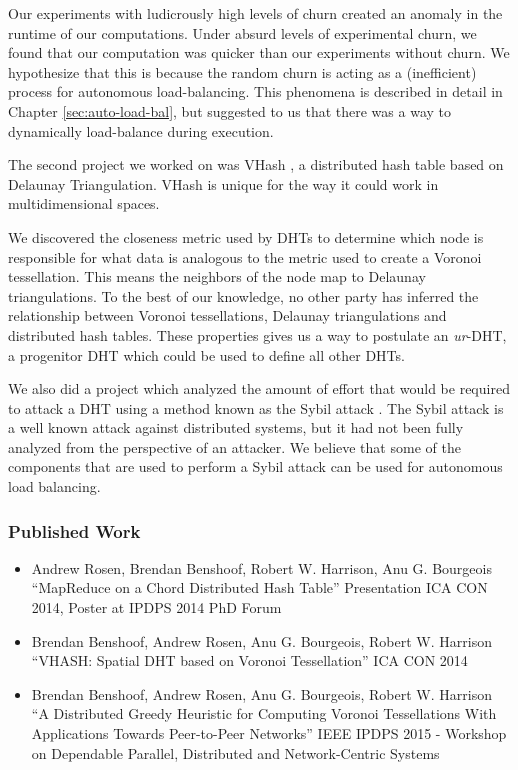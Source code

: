 Our experiments with ludicrously high levels of churn created an anomaly in the runtime of our computations.
Under absurd levels of experimental churn, we found that our computation was quicker than our experiments without churn.
We hypothesize that this is because the random churn is acting as a (inefficient) process for autonomous load-balancing.
This phenomena is described in detail in Chapter \ref{sec:auto-load-bal}, but suggested to us that there was a way to  dynamically load-balance during execution.

The second project we worked on was VHash \cite{vhash} \cite{dgvh}, a distributed hash table based on Delaunay Triangulation.
VHash is unique for the way it could work in multidimensional spaces.

We discovered the closeness metric used by DHTs to determine which node is responsible for what data is analogous to the metric used to create a Voronoi tessellation.
This means the neighbors of the node map to Delaunay triangulations. 
To the best of our knowledge, no other party has inferred the relationship between Voronoi tessellations, Delaunay triangulations and distributed hash tables.
These properties gives us a way to postulate an \textit{ur}-DHT, a progenitor DHT which could be used to define all other DHTs.




We also did a project which analyzed the amount of effort that would be required to attack a DHT using a method known as the Sybil attack \cite{sybil-analysis}.
The Sybil attack \cite{sybil} is a well known attack against distributed systems, but it had not been fully analyzed from the perspective of an attacker.
We believe that some of the components that are used to perform a Sybil attack can be used for autonomous load balancing.



\subsubsection{Published Work}

\begin{itemize}
	\item Andrew Rosen, Brendan Benshoof, Robert W. Harrison, Anu G. Bourgeois ``MapReduce on a Chord Distributed Hash Table'' Presentation ICA CON 2014, Poster at IPDPS 2014 PhD Forum
	\item Brendan Benshoof, Andrew Rosen, Anu G. Bourgeois, Robert W. Harrison ``VHASH: Spatial DHT based on Voronoi Tessellation'' ICA CON 2014
	\item Brendan Benshoof, Andrew Rosen, Anu G. Bourgeois, Robert W. Harrison ``A Distributed Greedy Heuristic for Computing Voronoi Tessellations With Applications Towards Peer-to-Peer Networks'' IEEE IPDPS 2015 - Workshop on Dependable Parallel, Distributed and Network-Centric Systems
	
\end{itemize}




